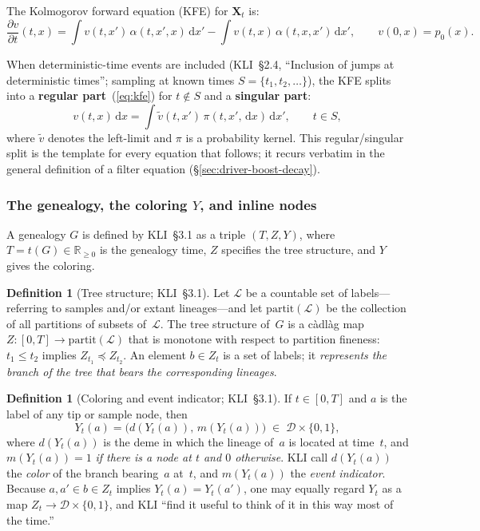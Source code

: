 \documentclass[11pt,leqno]{article}
\newcommand{\Xr}{\mathbf{X}}        %
\newcommand{\Demes}{\mathcal{D}}    %
\newcommand{\Rp}{\mathbb{R}_{\ge 0}}
\newcommand{\dd}[1]{\,\mathrm{d}{#1}}
\theoremstyle{plain}
\theoremstyle{definition}
\newtheorem{definition}[theorem]{Definition}
\begin{document}
The Kolmogorov forward equation (KFE) for $\Xr_t$ is:
\begin{equation}\label{eq:kfe}
  \frac{\partial v}{\partial t}(t,x)
  = \int v(t,x')\,\alpha(t,x',x)\dd{x'}
  - \int v(t,x)\,\alpha(t,x,x')\dd{x'}, \qquad
  v(0,x) = p_0(x).
\end{equation}

When deterministic-time events are included (KLI~\S2.4, ``Inclusion of
jumps at deterministic times''; sampling at known times
$S = \{t_1, t_2, \ldots\}$), the KFE splits into a \textbf{regular
part}~(\ref{eq:kfe}) for $t \notin S$ and a \textbf{singular part}:
\begin{equation}\label{eq:kfe-sing}
  v(t,x)\dd{x} = \int \tilde{v}(t,x')\,\pi(t,x',\dd{x})\dd{x'},
  \qquad t \in S,
\end{equation}
where $\tilde{v}$ denotes the left-limit and $\pi$ is a probability
kernel.  This regular/singular split is the template for every
equation that follows; it recurs verbatim in the general definition of
a filter equation (\S\ref{sec:driver-boost-decay}).

\subsubsection{The genealogy, the coloring $Y$, and inline nodes}

A genealogy $G$ is defined by KLI~\S3.1 as a triple $(T, Z, Y)$, where
$T = t(G) \in \Rp$ is the genealogy time, $Z$ specifies the tree
structure, and $Y$ gives the coloring.

\begin{definition}[Tree structure; KLI~\S3.1]
Let $\mathcal{L}$ be a countable set of labels---referring to samples
and/or extant lineages---and let $\mathrm{partit}(\mathcal{L})$ be the
collection of all partitions of subsets of~$\mathcal{L}$.  The tree
structure of~$G$ is a c\`adl\`ag map
$Z : [0,T] \to \mathrm{partit}(\mathcal{L})$ that is monotone with
respect to partition fineness: $t_1 \le t_2$ implies
$Z_{t_1} \preccurlyeq Z_{t_2}$.  An element $b \in Z_t$ is a set of
labels; it \emph{represents the branch of the tree that bears the
corresponding lineages}.
\end{definition}

\begin{definition}[Coloring and event indicator; KLI~\S3.1]
If $t \in [0,T]$ and $a$ is the label of any tip or sample node, then
\[
  Y_t(a) = \bigl(d(Y_t(a)),\, m(Y_t(a))\bigr)
    \;\in\; \Demes \times \{0,1\},
\]
where $d(Y_t(a))$ is the deme in which the lineage of~$a$ is located
at time~$t$, and $m(Y_t(a)) = 1$ \emph{if there is a node at $t$ and
$0$ otherwise}.  KLI call $d(Y_t(a))$ the \emph{color} of the branch
bearing~$a$ at~$t$, and $m(Y_t(a))$ the \emph{event indicator}.
Because $a, a' \in b \in Z_t$ implies $Y_t(a) = Y_t(a')$, one may
equally regard $Y_t$ as a map $Z_t \to \Demes \times \{0,1\}$, and
KLI ``find it useful to think of it in this way most of the time.''
\end{definition}
\end{document}
